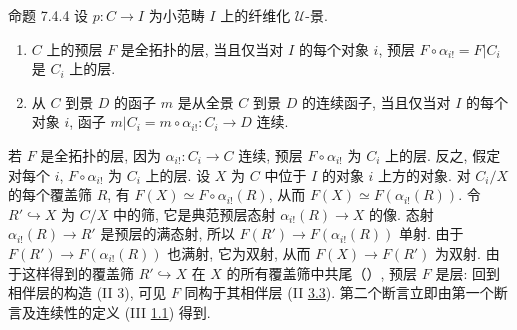 \begin{enonce*}{命题 7.4.4}
设 $p:C\to I$ 为小范畴 $I$ 上的纤维化 $𝒰$-景.
\begin{enumerate}
\renewcommand{\labelenumi}{\theenumi)}
\item $C$ 上的预层 $F$ 是全拓扑的层,
当且仅当对 $I$ 的每个对象 $i$,
预层 $F\circ\alpha_{i!}=F|C_i$ 是 $C_i$ 上的层.

\item 从 $C$ 到景 $D$ 的函子 $m$ 是从全景 $C$ 到景 $D$ 的连续函子,
当且仅当对 $I$ 的每个对象 $i$,
函子 $m|C_i=m\circ\alpha_{i!}:C_i\to D$ 连续.
\end{enumerate}
\end{enonce*}

若 $F$ 是全拓扑的层, 因为 $\alpha_{i!}:C_i\to C$ 连续,
预层 $F\circ\alpha_{i!}$ 为 $C_i$ 上的层.
反之, 假定对每个 $i$, $F\circ\alpha_{i!}$ 为 $C_i$ 上的层.
设 $X$ 为 $C$ 中位于 $I$ 的对象 $i$ 上方的对象.
对 $C_i/X$ 的每个覆盖筛 $R$, 有 $F(X)\simeq F\circ\alpha_{i!}(R)$,
从而 $F(X)\simeq F(\alpha_{i!}(R))$.
令 $R'\hookrightarrow X$ 为 $C/X$ 中的筛,
它是典范预层态射 $\alpha_{i!}(R)\to X$ 的像.
态射 $\alpha_{i!}(R)\to R'$ 是预层的满态射,
所以 $F(R')\to F(\alpha_{i!}(R))$ 单射.
由于 $F(R')\to F(\alpha_{i!}(R))$ 也满射, 它为双射,
从而 $F(X)\to F(R')$ 为双射.
由于这样得到的覆盖筛 $R'\hookrightarrow X$ 在 $X$ 的所有覆盖筛中共尾（）,
预层 $F$ 是层:
回到相伴层的构造 (II 3), 可见 $F$ 同构于其相伴层
(II \hyperref[II.rem3.3]{3.3}).
第二个断言立即由第一个断言及连续性的定义 (III \hyperref[III.def1.1]{1.1}) 得到.

\setcounter{subsubsection}{4}
\subsubsection{}

